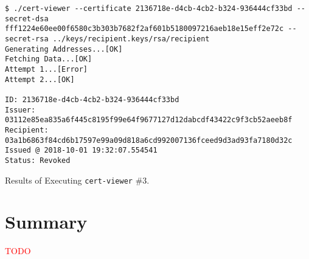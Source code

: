 \begin{listing}[ht]
	\begin{verbatim}
$ ./cert-viewer --certificate 2136718e-d4cb-4cb2-b324-936444cf33bd --secret-dsa fff1224e60ee00f6580c3b303b7682f2af601b5180097216aeb18e15eff2e72c --secret-rsa ../keys/recipient.keys/rsa/recipient
Generating Addresses...[OK]
Fetching Data...[OK]
Attempt 1...[Error]
Attempt 2...[OK]

ID: 2136718e-d4cb-4cb2-b324-936444cf33bd
Issuer: 03112e85ea835a6f445c8195f99e64f9677127d12dabcdf43422c9f3cb52aeeb8f
Recipient: 03a1b6863f84cd6b17597e99a09d818a6cd992007136fceed9d3ad93fa7180d32c
Issued @ 2018-10-01 19:32:07.554541
Status: Revoked

\end{verbatim}
	\caption{Results of Executing \texttt{cert-viewer} \#3.}
	\label{listing:view-revoke-results}
\end{listing}

\section{Summary}

\textcolor{red}{TODO}
